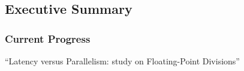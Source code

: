 \graphicspath{{../../../PhD/paper_factory/thesis_louis/Chapter6/Figs/}}
\subsection{Executive Summary}
\begin{frame}
    \frametitle{Current Progress}

    \centering
    \huge ``Latency versus Parallelism: study on Floating-Point Divisions''
    \normalsize

    \vspace{1em} %

    \tableofcontents[currentsection,
                     subsectionstyle=show/shaded/hide,
                     sectionstyle=show/hide]

\end{frame}

%
%
%
%

